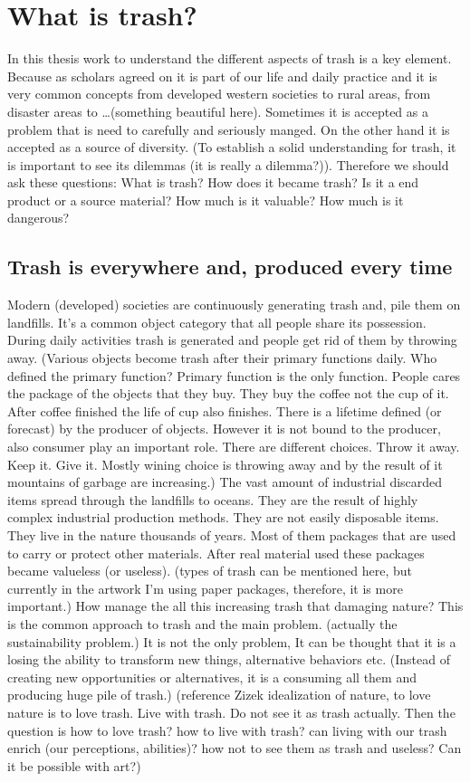 \documentclass[12pt]{article}
\begin{document}
\section{What is trash?}
In this thesis work to understand the different aspects of trash is a key element. Because as scholars agreed on it is part of our life and daily practice and it is very common concepts from developed western societies to rural areas, from disaster areas to \ldots(something beautiful here). Sometimes it is accepted as a problem that is need to carefully and seriously manged. On the other hand it is accepted as a source of diversity. (To establish a solid understanding for trash, it is important to see its dilemmas (it is really a dilemma?)). Therefore we should ask these questions: What is trash? How does it became trash? Is it a end product or a source material? How much is it valuable? How much is it dangerous?

\subsection{Trash is everywhere and, produced every time}
Modern (developed) societies are continuously generating trash and, pile them on landfills. It's a common object category that all people share its possession. During daily activities trash is generated and people get rid of them by throwing away. (Various objects become trash after their primary functions daily. Who defined the primary function? Primary function is the only function. People cares the package of the objects that they buy. They buy the coffee not the cup of it. After coffee finished the life of cup also finishes. There is a lifetime defined (or forecast) by the producer of objects. However it is not bound to the producer, also consumer play an important role. There are different choices. Throw it away. Keep it. Give it. Mostly wining choice is throwing away and by the result of it mountains of garbage are increasing.) The vast amount of industrial discarded items spread through the landfills to oceans. They are the result of highly complex industrial production methods. They are not easily disposable items. They live in the nature thousands of years. Most of them packages that are used to carry or protect other materials. After real material used these packages became valueless (or useless). (types of trash can be mentioned here, but currently in the artwork I'm using paper packages, therefore, it is more important.) How manage the all this increasing trash that damaging nature?  This is the common approach to trash and the main problem. (actually the sustainability problem.) It is not the only problem, It can be thought that it is a losing the ability to transform new things, alternative behaviors etc. (Instead of creating new opportunities or alternatives, it is a consuming all them and producing huge pile of trash.) (reference Zizek idealization of nature, to love nature is to love trash. Live with trash. Do not see it as trash actually. Then the question is how to love trash? how to live with trash? can living with our trash enrich (our perceptions, abilities)? how not to see them as trash and useless? Can it be possible with art?)
\end{document}
